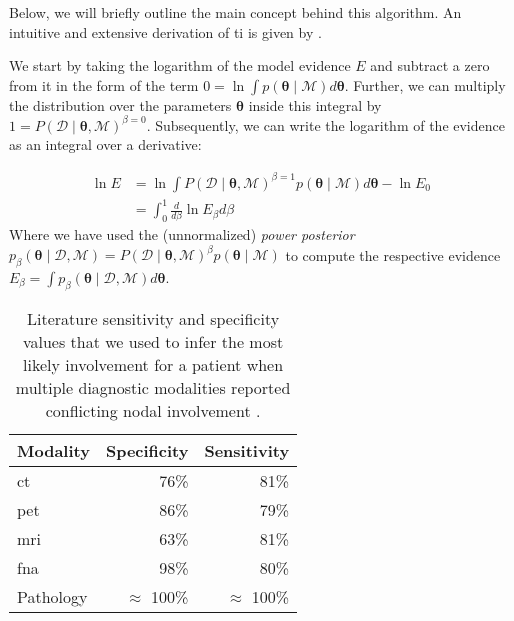 \documentclass[twocolumn]{article}
\begin{document}
Below, we will briefly outline the main concept behind this algorithm. An intuitive and extensive derivation of \gls{ti} is given by \cite{aponte_introduction_2022}.

We start by taking the logarithm of the model evidence $E$ and subtract a zero from it in the form of the term $0 = \ln \int p(\boldsymbol{\theta} \mid \mathcal{M}) d\boldsymbol{\theta}$. Further, we can multiply the distribution over the parameters $\boldsymbol{\theta}$ inside this integral by $1 = P \left( \boldsymbol{\mathcal{D}} \mid \boldsymbol{\theta}, \mathcal{M} \right)^{\beta=0}$. Subsequently, we can write the logarithm of the evidence as an integral over a derivative:

\begin{equation} \label{eq:ti}
    \begin{aligned}
        \ln E &= \ln \int P \left( \boldsymbol{\mathcal{D}} \mid \boldsymbol{\theta}, \mathcal{M} \right)^{\beta=1} p \left( \boldsymbol{\theta} \mid \mathcal{M} \right) d\boldsymbol{\theta} - \ln E_0 \\
        &= \int_0^1 \frac{d}{d\beta} \ln E_\beta d\beta
    \end{aligned}
\end{equation}
%
Where we have used the (unnormalized) \emph{power posterior} $p_\beta \left( \boldsymbol{\theta} \mid \boldsymbol{\mathcal{D}}, \mathcal{M} \right) = P \left( \boldsymbol{\mathcal{D}} \mid \boldsymbol{\theta}, \mathcal{M} \right)^\beta p \left( \boldsymbol{\theta} \mid \mathcal{M} \right)$ to compute the respective evidence $E_\beta = \int p_\beta \left( \boldsymbol{\theta} \mid \boldsymbol{\mathcal{D}}, \mathcal{M} \right) d\boldsymbol{\theta}$.

\begin{table}[t]
\centering
\begin{tabular}{|l|rr|}
    \hline
    \textbf{Modality} & \textbf{Specificity} & \textbf{Sensitivity} \\
    \hline
    \acrshort{ct} & 76\% & 81\% \\
    \acrshort{pet} & 86\% & 79\% \\
    \gls{mri} & 63\% & 81\% \\
    \acrshort{fna} & 98\% & 80\% \\
    Pathology & $\approx$ 100\% & $\approx$ 100\% \\
    \hline
\end{tabular}
\caption{Literature sensitivity and specificity values that we used to infer the most likely involvement for a patient when multiple diagnostic modalities reported conflicting nodal involvement \cite{de_bondt_detection_2007,kyzas_18f-fluorodeoxyglucose_2008}.}
\label{table:sens_spec}
\end{table}
\end{document}
